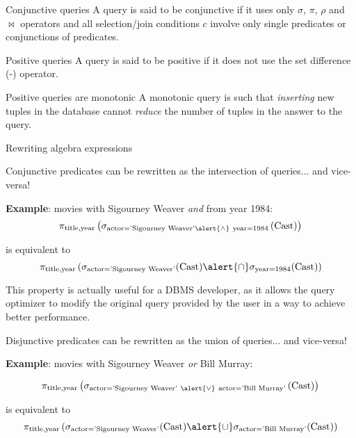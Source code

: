 \documentclass[xcolor={usenames,dvipsnames}]{beamer}
\begin{document}
%
%
\begin{frame}
\label{conjunctiveQueriesMonotonicity}
\vspace*{2em}
\begin{BOX}{Conjunctive queries}
A query is said to be conjunctive if it uses only $\sigma$, $\pi$, $\rho$ and $\Join$ operators and all selection/join conditions $c$ involve only single predicates or conjunctions of predicates.
\end{BOX}

\begin{BOX}{Positive queries}
A query is said to be positive if it does not use the set difference (-) operator.
\end{BOX}

\begin{BOX}{Positive queries are monotonic}
A monotonic query is such that \emph{inserting} new tuples in the database cannot \emph{reduce} the number of tuples in the answer to the query.
\end{BOX}
\end{frame}


%
%
\begin{frame}{Rewriting algebra expressions}

Conjunctive predicates can be rewritten as the intersection of queries... and vice-versa!

\textbf{Example}: movies with Sigourney Weaver \emph{and} from year 1984:
\[ \pi_{\text{title,year}}\left(
\sigma_{\text{actor='Sigourney Weaver'}\alert{\wedge}\ \text{year}=1984}
\left(\text{Cast} \right)\right)\]

is equivalent to
\[
\pi_{\text{title,year}}
\left(
\sigma_{\text{actor='Sigourney Weaver'}}(\text{Cast})
\alert{\cap}
\sigma_{\text{year}=1984}(\text{Cast})
\right)
\]

This property is actually useful for a DBMS developer, as it allows the query optimizer to modify the original query provided by the user in a way to achieve better performance.
\end{frame}


%
%
\begin{frame}
\label{disjunctionAndUnion}
Disjunctive predicates can be rewritten as the union of queries... and vice-versa!

\textbf{Example}: movies with Sigourney Weaver \emph{or} Bill Murray:


\[ \pi_{\text{title,year}}\left(
\sigma_{\text{actor='Sigourney Weaver'}\ \alert{\vee}\ \text{actor='Bill Murray'}}
\left(\text{Cast}\right)\right)\]

is equivalent to
\[
\pi_{\text{title,year}}
\left(
\sigma_{\text{actor='Sigourney Weaver'}}(\text{Cast})
\alert{\cup}
\sigma_{\text{actor='Bill Murray'}}(\text{Cast})
\right)
\]
\end{frame}
\end{document}
